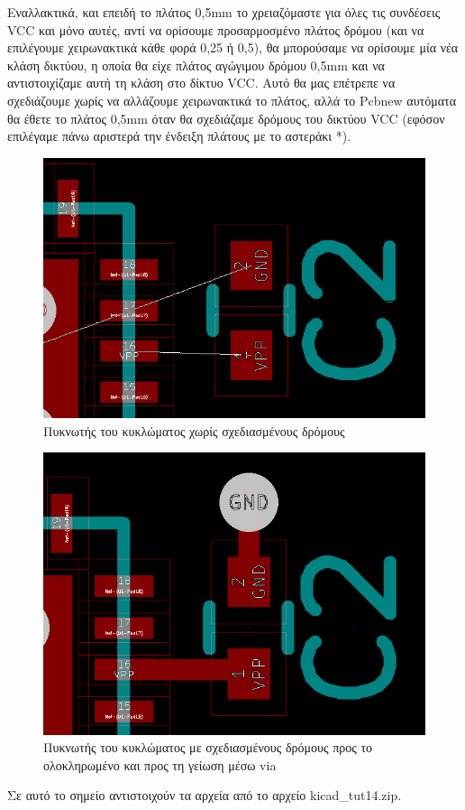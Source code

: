 \documentclass[a4paper]{article}
\begin{document}
Εναλλακτικά, και επειδή το πλάτος 0,5mm το χρειαζόμαστε για όλες τις συνδέσεις VCC και μόνο αυτές,  αντί να ορίσουμε προσαρμοσμένο πλάτος δρόμου (και να  επιλέγουμε χειρωνακτικά κάθε φορά 0,25 ή 0,5), θα μπορούσαμε να ορίσουμε μία νέα κλάση δικτύου, η οποία θα είχε πλάτος αγώγιμου δρόμου 0,5mm και να αντιστοιχίζαμε αυτή τη κλάση στο δίκτυο VCC. Αυτό θα μας επέτρεπε να σχεδιάζουμε χωρίς να αλλάζουμε χειρωνακτικά το πλάτος, αλλά το Pcbnew αυτόματα θα έθετε το πλάτος 0,5mm όταν θα σχεδιάζαμε δρόμους του δικτύου VCC (εφόσον επιλέγαμε πάνω αριστερά την ένδειξη πλάτους με το αστεράκι *). 

\begin{figure}
  \begin{center}
    \includegraphics[width=.5\textwidth]{img/pcb-circ-notrack}
    \caption{Πυκνωτής του κυκλώματος χωρίς σχεδιασμένους δρόμους}
    \label{fig:pcb-circ-notrack}
  \end{center}
\end{figure}

\begin{figure}
  \begin{center}
    \includegraphics[width=.5\textwidth]{img/pcb-circ-track.png}
    \caption{Πυκνωτής του κυκλώματος με σχεδιασμένους δρόμους προς το ολοκληρωμένο και προς τη γείωση μέσω via}
    \label{fig:pcb-circ-track}
  \end{center}
\end{figure}

Σε αυτό το σημείο αντιστοιχούν τα αρχεία από το αρχείο kicad\_tut14.zip.
\end{document}
